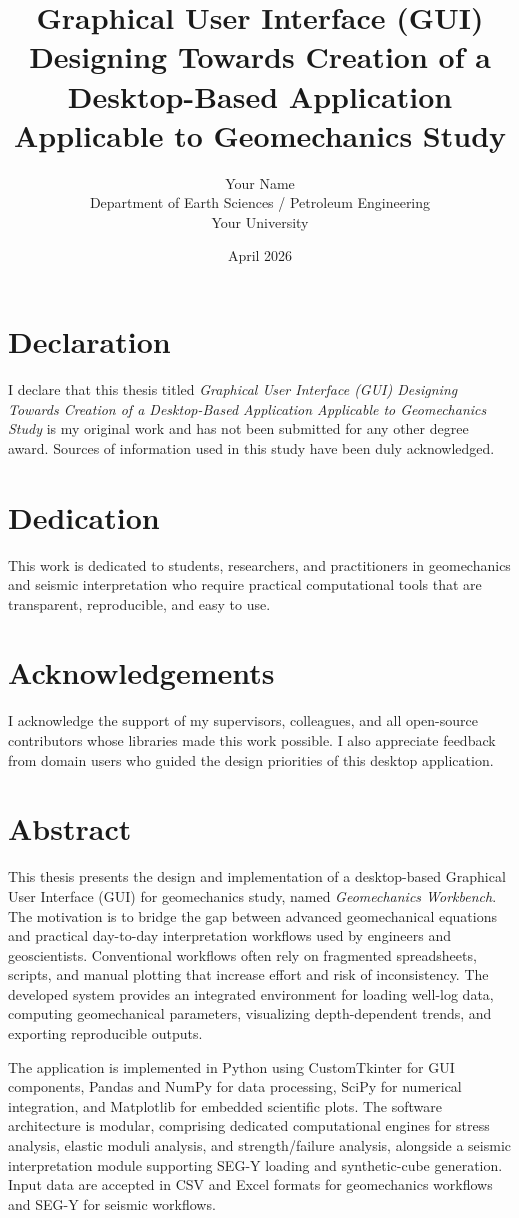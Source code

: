 \documentclass[12pt,a4paper]{report}
\title{\textbf{Graphical User Interface (GUI) Designing Towards Creation of a Desktop-Based Application Applicable to Geomechanics Study}}
\author{Your Name \\ Department of Earth Sciences / Petroleum Engineering \\ Your University}
\date{April 2026}
\begin{document}
\maketitle

\chapter*{Declaration}
I declare that this thesis titled \emph{Graphical User Interface (GUI) Designing Towards Creation of a Desktop-Based Application Applicable to Geomechanics Study} is my original work and has not been submitted for any other degree award. Sources of information used in this study have been duly acknowledged.

\chapter*{Dedication}
This work is dedicated to students, researchers, and practitioners in geomechanics and seismic interpretation who require practical computational tools that are transparent, reproducible, and easy to use.

\chapter*{Acknowledgements}
I acknowledge the support of my supervisors, colleagues, and all open-source contributors whose libraries made this work possible. I also appreciate feedback from domain users who guided the design priorities of this desktop application.

\chapter*{Abstract}
This thesis presents the design and implementation of a desktop-based Graphical User Interface (GUI) for geomechanics study, named \emph{Geomechanics Workbench}. The motivation is to bridge the gap between advanced geomechanical equations and practical day-to-day interpretation workflows used by engineers and geoscientists. Conventional workflows often rely on fragmented spreadsheets, scripts, and manual plotting that increase effort and risk of inconsistency. The developed system provides an integrated environment for loading well-log data, computing geomechanical parameters, visualizing depth-dependent trends, and exporting reproducible outputs.

The application is implemented in Python using CustomTkinter for GUI components, Pandas and NumPy for data processing, SciPy for numerical integration, and Matplotlib for embedded scientific plots. The software architecture is modular, comprising dedicated computational engines for stress analysis, elastic moduli analysis, and strength/failure analysis, alongside a seismic interpretation module supporting SEG-Y loading and synthetic-cube generation. Input data are accepted in CSV and Excel formats for geomechanics workflows and SEG-Y for seismic workflows.
\end{document}
